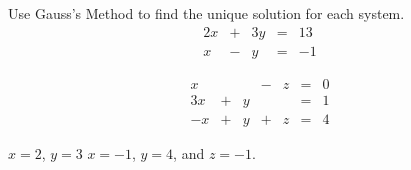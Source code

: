 

\begin{Exercise}[
name={},
title={}, 
difficulty=0,
origin={by Jim Hefferon \cite{JH}}]
Use Gauss's Method to find the unique solution for each system.
\Question
\[
\begin{array}{ccccccccccccccc}
      2x  &+  &3y  &=  &13  \\
          x   &-  &y   &=  &-1
\end{array}
\]

\Question
\[
\begin{array}{ccccccccccccccc}
          x   &  &  &-  &z  &=  &0  \\
          3x  &+ &y &   &   &=  &1  \\
          -x  &+ &y &+  &z  &=  &4
\end{array}
\]

\end{Exercise}

\begin{Answer}
\Question $x=2$, $y=3$
\Question $x=-1$, $y=4$, and $z=-1$.
\end{Answer}
